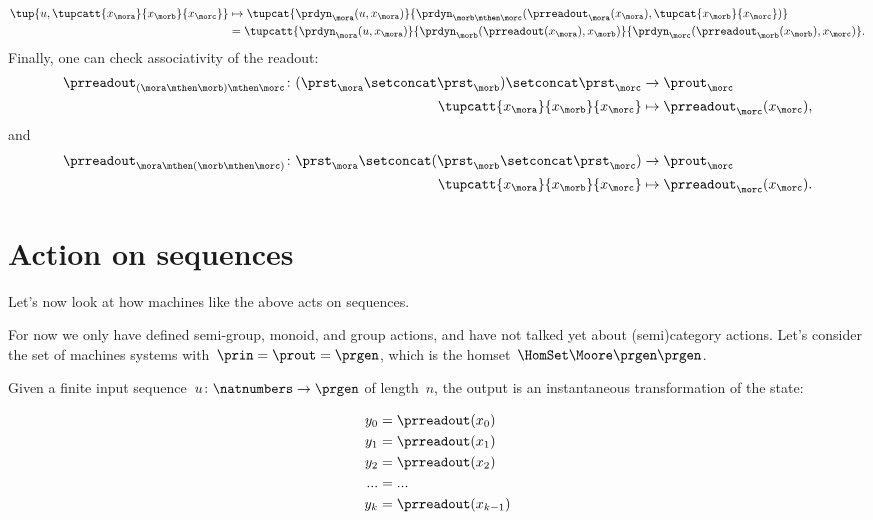 \begin{solution}
\begin{equation*}
\begin{aligned}
  \tup{u, \tupcatt{x_{\mora}}{x_{\morb}}{x_\morc}}&\mapsto \tupcat{\prdyn_{\mora}(u,x_\mora)}{\prdyn_{\morb\mthen \morc}(\prreadout_{\mora}(x_\mora),\tupcat{x_\morb}{x_\morc})}\\
  &=\tupcatt{\prdyn_\mora(u,x_\mora)}{\prdyn_\morb(\prreadout(x_\mora),x_\morb)}{\prdyn_\morc(\prreadout_\morb(x_\morb),x_\morc)}.
\end{aligned}
\end{equation*}
  Finally, one can check associativity of the readout:
  \begin{equation*}
    \label{eq:assoc_moore_3}
    \begin{aligned}
      \prreadout_{(\mora \mthen \morb)\mthen \morc}\colon (\prst_\mora \setconcat \prst_\morb)\setconcat \prst_\morc &\to \prout_\morc\\
      \tupcatt{x_\mora}{x_\morb}{x_\morc} &\mapsto \prreadout_\morc(x_\morc),
\end{aligned}
\end{equation*}
  and
    \begin{equation*}
    \label{eq:assoc_moore_4}
    \begin{aligned}
      \prreadout_{\mora \mthen (\morb\mthen \morc)}\colon \prst_\mora \setconcat (\prst_\morb\setconcat \prst_\morc) &\to \prout_\morc\\
      \tupcatt{x_\mora}{x_\morb}{x_\morc} &\mapsto \prreadout_\morc(x_\morc).
\end{aligned}
\end{equation*}
\end{solution}
\section{Action on sequences}

Let's now look at how machines like the above acts on sequences.

For now we only have defined semi-group, monoid, and group actions, and have not talked yet about (semi)category actions.
Let's consider the set of machines systems with~$\prin = \prout = \prgen$, which is the homset~$\HomSet\Moore\prgen\prgen$.

Given a finite input sequence~$u\colon \natnumbers \to \prgen$ of length~$n$, the output is an instantaneous transformation of the state:

\begin{equation}\label{eq:actions-on-sequences-y}
  \begin{aligned}
  y_0 &= \prreadout(x_0) \\
  y_1 &= \prreadout(x_1) \\
  y_2 &= \prreadout(x_2) \\
  ... &= ...  \\
  y_{k} &= \prreadout(x_{k-1})
\end{aligned}
\end{equation}

